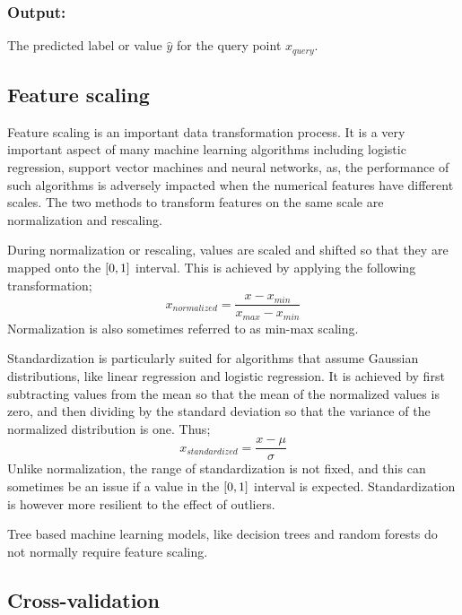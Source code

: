 		\subsubsection{Output:}
		The predicted label or value $\hat{y}$ for the query point $x_{query}$.
		



	\subsection{Feature scaling}

		Feature scaling\cite{geron2022hands} is an important data transformation process. It is a very important aspect of many machine learning algorithms including logistic regression, support vector machines and neural networks, as, the performance of such algorithms is adversely impacted when the numerical features have different scales. The two methods to transform features on the same scale are normalization and rescaling.
		
		During normalization or rescaling, values are scaled and shifted so that they are mapped onto the $[0,\space 1]$ interval. This is achieved by applying the following transformation;
		$$
		x_{normalized} = \frac{x - x_{min}}{x_{max}-x_{min}}
		$$
		Normalization is also sometimes referred to as min-max scaling.
		
		Standardization is particularly suited for algorithms that assume Gaussian distributions, like linear regression and logistic regression. It is achieved by first subtracting values from the mean so that the mean of the normalized values is zero, and then dividing by the standard deviation so that the variance of the normalized distribution is one. Thus;
		$$
		x_{standardized} = \frac{x - \mu}{\sigma}
		$$
		Unlike normalization, the range of standardization is not fixed, and this can sometimes be an issue if a value in the $[0,\space 1]$ interval is expected.  Standardization is however more resilient to the effect of outliers.
		
		Tree based machine learning models, like decision trees and random forests do not normally require feature scaling.


	
	\subsection{Cross-validation}
	
